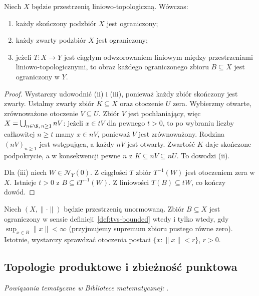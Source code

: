 \begin{twierdzenie}\label{thm:compact-bounded}
Niech $X$ będzie przestrzenią liniowo-topologiczną.
Wówczas:
\begin{enumerate}[label=\textup{(\roman*)}]
 \item każdy skończony podzbiór $X$ jest ograniczony;
 \item każdy zwarty podzbiór $X$ jest ograniczony;
 \item jeżeli $T\colon X\to Y$ jest ciągłym odwzorowaniem liniowym
       między przestrzeniami liniowo-topologicznymi, to obraz
       każdego ograniczonego zbioru $B\subseteq X$ jest ograniczony w $Y$.
\end{enumerate}
\end{twierdzenie}
\begin{proof}
Wystarczy udowodnić (ii) i (iii), ponieważ każdy zbiór
skończony jest zwarty. Ustalmy zwarty zbiór $K\subseteq X$
oraz otoczenie $U$ zera. Wybierzmy otwarte, zrównoważone
otoczenie $V\subseteq U$. Zbiór $V$ jest pochłaniający,
więc $X=\bigcup_{n\in\N,\,n\geq1}nV$: jeżeli $x\in tV$ dla
pewnego $t>0$, to po wybraniu liczby całkowitej $n\geq t$
mamy $x\in nV$, ponieważ $V$ jest zrównoważony.
Rodzina $(nV)_{n\geq1}$ jest wstępująca, a każdy $nV$
jest otwarty. Zwartość $K$ daje skończone podpokrycie,
a w konsekwencji pewne $n$ z $K\subseteq nV\subseteq nU$.
To dowodzi (ii).

Dla (iii) niech $W\in\mathcal N_Y(0)$.
Z ciągłości $T$ zbiór $T^{-1}(W)$ jest otoczeniem zera w $X$.
Istnieje $t>0$ z $B\subseteq tT^{-1}(W)$.
Z liniowości $T(B)\subseteq tW$, co kończy dowód.
\end{proof}

\begin{przyklad}
Niech $(X,\|\cdot\|)$ będzie przestrzenią unormowaną.
Zbiór $B\subseteq X$ jest ograniczony w sensie
definicji~\ref{def:tvs-bounded} wtedy i tylko wtedy, gdy
$\sup_{x\in B}\|x\|<\infty$ (przyjmujemy supremum zbioru
pustego równe zero). Istotnie, wystarczy sprawdzać
otoczenia postaci $\{x:\|x\|<r\}$, $r>0$.
\end{przyklad}

\subsection{Topologie produktowe i zbieżność punktowa}

\noindent\emph{Powiązania tematyczne w Bibliotece matematycznej:} .



